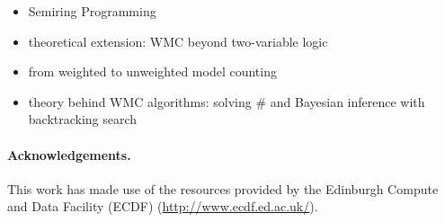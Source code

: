 \documentclass{article}
\theoremstyle{definition}
\theoremstyle{remark}
\begin{document}
\begin{itemize}
\begin{itemize}
\begin{itemize}
    \item Semiring Programming \cite{DBLP:journals/corr/BelleR16}
    \item theoretical extension: WMC beyond two-variable logic
      \cite{DBLP:conf/lics/KuusistoL18}
    \item from weighted to unweighted model counting
      \cite{DBLP:conf/ijcai/ChakrabortyFMV15}
    \item theory behind WMC algorithms: solving \#\SAT{} and Bayesian inference
      with backtracking search \cite{DBLP:journals/jair/BacchusDP09}
    \end{itemize}
  \end{itemize}
\end{itemize}

\paragraph{Acknowledgements.} This work has made use of the resources provided
by the Edinburgh Compute and Data Facility (ECDF)
(\url{http://www.ecdf.ed.ac.uk/}).



\end{document}
